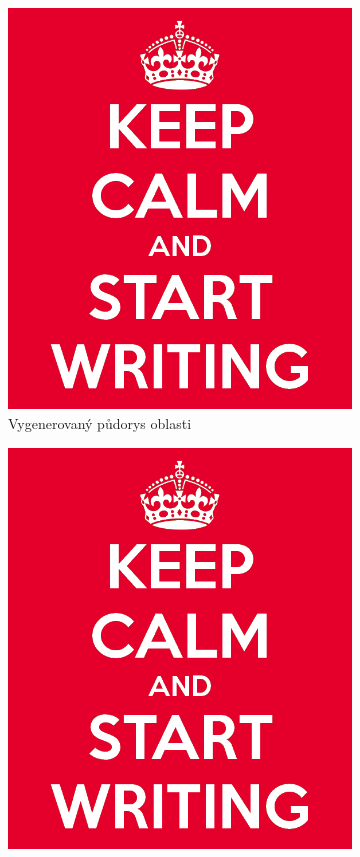 \begin{description}
	\begin{figure}
		\centering
		\begin{subfigure}[b]{0.475\textwidth}
			\includegraphics[scale=0.3]{obrazky-figures/keep-calm.png}
			\caption{Vygenerovaný půdorys oblasti}
		\end{subfigure}
		\begin{subfigure}[b]{0.475\textwidth}
			\includegraphics[scale=0.3]{obrazky-figures/keep-calm.png}

\end{subfigure}
\end{figure}
\end{description}
